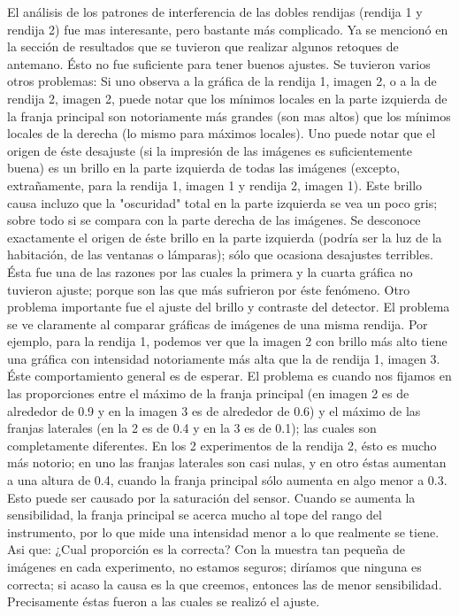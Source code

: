 \documentclass[12p]{article}
\begin{document}
El análisis de los patrones de interferencia de las dobles rendijas (rendija 1 y rendija 2) fue mas interesante, pero bastante más complicado. Ya se mencionó en la sección de resultados que se tuvieron que realizar algunos retoques de antemano. Ésto no fue suficiente para tener buenos ajustes. Se tuvieron varios otros problemas: Si uno observa a la gráfica de la rendija 1, imagen 2, o a la de rendija 2, imagen 2, puede notar que los mínimos locales en la parte izquierda de la franja principal son notoriamente más grandes (son mas altos) que los mínimos locales de la derecha (lo mismo para máximos locales). Uno puede notar que el origen de éste desajuste (si la impresión de las imágenes es suficientemente buena) es un brillo en la parte izquierda de todas las imágenes (excepto, extrañamente, para la rendija 1, imagen 1 y rendija 2, imagen 1). Este brillo causa incluzo que la "oscuridad" total en la parte izquierda se vea un poco gris; sobre todo si se compara con la parte derecha de las imágenes. Se desconoce exactamente el origen de éste brillo en la parte izquierda (podría ser la luz de la habitación, de las ventanas o lámparas); sólo que ocasiona desajustes terribles. Ésta fue una de las razones por las cuales la primera y la cuarta gráfica no tuvieron ajuste; porque son las que más sufrieron por éste fenómeno. Otro problema importante fue el ajuste del brillo y contraste del detector. El problema se ve claramente al comparar gráficas de imágenes de una misma rendija. Por ejemplo, para la rendija 1, podemos ver que la imagen 2 con brillo más alto tiene una gráfica con intensidad notoriamente más alta que la de rendija 1, imagen 3. Éste comportamiento general es de esperar. El problema es cuando nos fijamos en las proporciones entre el máximo de la franja principal (en imagen 2 es de alrededor de 0.9 y en la imagen 3 es de alrededor de 0.6) y el máximo de las franjas laterales (en la 2 es de 0.4 y en la 3 es de 0.1); las cuales son completamente diferentes.  En los 2 experimentos de la rendija 2, ésto es mucho más notorio; en uno las franjas laterales son casi nulas, y en otro éstas aumentan a una altura de 0.4, cuando la franja principal sólo aumenta en algo menor a 0.3. Esto puede ser causado por la saturación del sensor. Cuando se aumenta la sensibilidad, la franja principal se acerca mucho al tope del rango del instrumento, por lo que mide una intensidad menor a lo que realmente se tiene. Asi que: ¿Cual proporción es la correcta? Con la muestra tan pequeña de imágenes en cada experimento, no estamos seguros; diríamos que ninguna es correcta; si acaso la causa es la que creemos, entonces las de menor sensibilidad. Precisamente éstas fueron a las cuales se realizó el ajuste.
\end{document}
